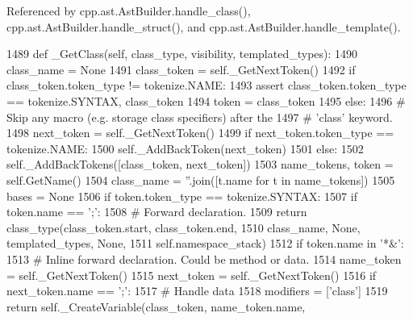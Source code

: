 Referenced by cpp.\+ast.\+Ast\+Builder.\+handle\+\_\+class(), cpp.\+ast.\+Ast\+Builder.\+handle\+\_\+struct(), and cpp.\+ast.\+Ast\+Builder.\+handle\+\_\+template().


\begin{DoxyCode}
1489     \textcolor{keyword}{def }\_GetClass(self, class\_type, visibility, templated\_types):
1490         class\_name = \textcolor{keywordtype}{None}
1491         class\_token = self.\_GetNextToken()
1492         \textcolor{keywordflow}{if} class\_token.token\_type != tokenize.NAME:
1493             \textcolor{keyword}{assert} class\_token.token\_type == tokenize.SYNTAX, class\_token
1494             token = class\_token
1495         \textcolor{keywordflow}{else}:
1496             \textcolor{comment}{# Skip any macro (e.g. storage class specifiers) after the}
1497             \textcolor{comment}{# 'class' keyword.}
1498             next\_token = self.\_GetNextToken()
1499             \textcolor{keywordflow}{if} next\_token.token\_type == tokenize.NAME:
1500                 self.\_AddBackToken(next\_token)
1501             \textcolor{keywordflow}{else}:
1502                 self.\_AddBackTokens([class\_token, next\_token])
1503             name\_tokens, token = self.GetName()
1504             class\_name = \textcolor{stringliteral}{''}.join([t.name \textcolor{keywordflow}{for} t \textcolor{keywordflow}{in} name\_tokens])
1505         bases = \textcolor{keywordtype}{None}
1506         \textcolor{keywordflow}{if} token.token\_type == tokenize.SYNTAX:
1507             \textcolor{keywordflow}{if} token.name == \textcolor{stringliteral}{';'}:
1508                 \textcolor{comment}{# Forward declaration.}
1509                 \textcolor{keywordflow}{return} class\_type(class\_token.start, class\_token.end,
1510                                   class\_name, \textcolor{keywordtype}{None}, templated\_types, \textcolor{keywordtype}{None},
1511                                   self.namespace\_stack)
1512             \textcolor{keywordflow}{if} token.name \textcolor{keywordflow}{in} \textcolor{stringliteral}{'*&'}:
1513                 \textcolor{comment}{# Inline forward declaration.  Could be method or data.}
1514                 name\_token = self.\_GetNextToken()
1515                 next\_token = self.\_GetNextToken()
1516                 \textcolor{keywordflow}{if} next\_token.name == \textcolor{stringliteral}{';'}:
1517                     \textcolor{comment}{# Handle data}
1518                     modifiers = [\textcolor{stringliteral}{'class'}]
1519                     \textcolor{keywordflow}{return} self.\_CreateVariable(class\_token, name\_token.name,

\end{DoxyCode}
